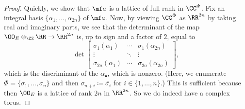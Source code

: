 \documentclass[../notes.tex]{subfiles}
\begin{document}
\begin{proof}
	Quickly, we show that $\mf a$ is a lattice of full rank in $\CC^\Phi$. Fix an integral basis $\{\alpha_1,\ldots,\alpha_{2n}\}$ of $\mf a$. Now, by viewing $\CC^\Phi$ as $\RR^{2n}$ by taking real and imaginary parts, we see that the determinant of the map $\OO_E\otimes_\ZZ\RR\to\RR^{2n}$ is, up to sign and a factor of $2$, equal to
	\[\det\begin{bmatrix}
		\sigma_1(\alpha_1) & \cdots & \sigma_{1}(\alpha_{2n}) \\
		\vdots & \ddots & \vdots \\
		\sigma_{2n}(\alpha_1) & \cdots & \sigma_{2n}(\alpha_{2n})
	\end{bmatrix},\]
	which is the discriminant of the $\alpha_\bullet$, which is nonzero. (Here, we enumerate $\Phi=\{\sigma_1,\ldots,\sigma_n\}$ and then $\sigma_{n+i}\coloneqq\overline{\sigma_i}$ for $i\in\{1,\ldots,n\}$.) This is sufficient because then $\OO_E$ is a lattice of rank $2n$ in $\RR^{2n}$. So we do indeed have a complex torus.


\end{proof}
\end{document}
